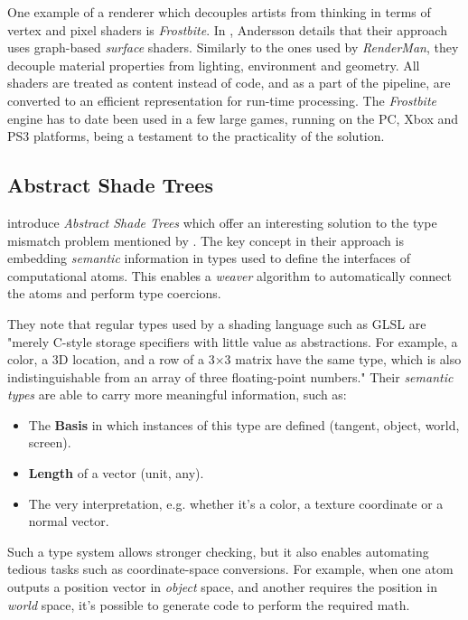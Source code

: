 One example of a renderer which decouples artists from thinking in terms of vertex and pixel shaders is \emph{Frostbite}. In \cite{AT07}, Andersson details that their approach uses graph-based \emph{surface} shaders. Similarly to the ones used by \emph{RenderMan}, they decouple material properties from lighting, environment and geometry. All shaders are treated as content instead of code, and as a part of the pipeline, are converted to an efficient representation for run-time processing. The \emph{Frostbite} engine has to date been used in a few large games, running on the PC, Xbox and PS3 platforms, being a testament to the practicality of the solution.

\subsection{Abstract Shade Trees}

\citet{mcguire2006shadetrees} introduce \emph{Abstract Shade Trees} which offer an interesting solution to the type mismatch problem mentioned by \citet{AbramWhitted90}. The key concept in their approach is embedding \emph{semantic} information in types used to define the interfaces of computational atoms. This enables a \emph{weaver} algorithm to automatically connect the atoms and perform type coercions.

They note that regular types used by a shading language such as GLSL are "merely C-style storage specifiers with little value as abstractions. For example, a color, a 3D location, and a row of a 3×3 matrix have the same type, which is also indistinguishable from an array of three floating-point numbers." Their \emph{semantic types} are able to carry more meaningful information, such as:
\begin{itemize}
\item The \textbf{Basis} in which instances of this type are defined (tangent, object, world, screen).
\item \textbf{Length} of a vector (unit, any).
\item The very interpretation, e.g. whether it's a color, a texture coordinate or a normal vector.
\end{itemize}

Such a type system allows stronger checking, but it also enables automating tedious tasks such as coordinate-space conversions. For example, when one atom outputs a position vector in \emph{object} space, and another requires the position in \emph{world} space, it's possible to generate code to perform the required math.

